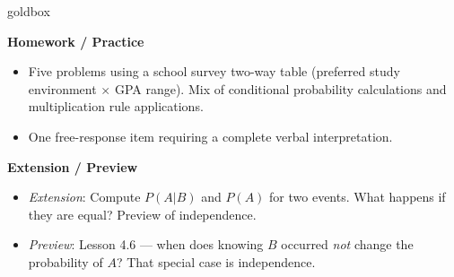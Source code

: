 \documentclass[10pt]{article}
\begin{document}
\begin{skillbox}{goldbox}
\begin{minipage}[t]{0.48\linewidth}
    \textbf{Homework / Practice}
    \begin{itemize}
        \item Five problems using a school survey two-way table (preferred study
              environment $\times$ GPA range). Mix of conditional probability
              calculations and multiplication rule applications.
        \item One free-response item requiring a complete verbal interpretation.
    \end{itemize}
\end{minipage}
\hfill
\begin{minipage}[t]{0.48\linewidth}
    \textbf{Extension / Preview}
    \begin{itemize}
        \item \textit{Extension}: Compute $P(A|B)$ and $P(A)$ for two events.
              What happens if they are equal? Preview of independence.
        \item \textit{Preview}: Lesson 4.6 --- when does knowing $B$ occurred
              \emph{not} change the probability of $A$? That special case is
              independence.
    \end{itemize}
\end{minipage}
\end{skillbox}
\end{document}
